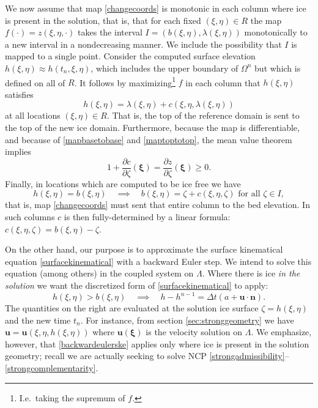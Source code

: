 \documentclass[letterpaper,final,12pt,reqno]{amsart}
\newcommand{\bn}{\mathbf{n}}
\newcommand{\bu}{\mathbf{u}}
\newcommand{\bxi}{\bm{\xi}}
\begin{document}
We now assume that map \eqref{changecoords} is monotonic in each column where ice is present in the solution, that is, that for each fixed $(\xi,\eta)\in R$ the map $f(\cdot) = z(\xi,\eta,\cdot)$ takes the interval $I=(b(\xi,\eta),\lambda(\xi,\eta))$ monotonically to a new interval in a nondecreasing manner.  We include the possibility that $I$ is mapped to a single point.  Consider the computed surface elevation $h(\xi,\eta)\approx h(t_n,\xi,\eta)$, which includes the upper boundary of $\Omega^n$ but which is defined on all of $R$.  It follows by maximizing\footnote{I.e.~taking the supremum of $f$.} $f$ in each column that $h(\xi,\eta)$ satisfies
\begin{equation}
h(\xi,\eta) = \lambda(\xi,\eta) + c(\xi,\eta,\lambda(\xi,\eta)) \label{maptoptotop}
\end{equation}
at all locations $(\xi,\eta)\in R$.  That is, the top of the reference domain is sent to the top of the new ice domain.  Furthermore, because the map is differentiable, and because of \eqref{mapbasetobase} and \eqref{maptoptotop}, the mean value theorem implies
\begin{equation}
1 + \frac{\partial c}{\partial \zeta}(\bxi) = \frac{\partial z}{\partial \zeta}(\bxi) \ge 0. \label{mapmonotonic}
\end{equation}
Finally, in locations which are computed to be ice free we have
\begin{equation}
h(\xi,\eta)=b(\xi,\eta) \quad \implies \quad b(\xi,\eta) = \zeta + c(\xi,\eta,\zeta) \text{ for all } \zeta \in I, \label{mapcrushes}
\end{equation}
that is, map \eqref{changecoords} must sent that entire column to the bed elevation.  In such columns $c$ is then fully-determined by a linear formula: $c(\xi,\eta,\zeta) = b(\xi,\eta) - \zeta$.

On the other hand, our purpose is to approximate the surface kinematical equation \eqref{surfacekinematical} with a backward Euler step.  We intend to solve this equation (among others) in the coupled system on $\Lambda$.  Where there is ice \emph{in the solution} we want the discretized form of \eqref{surfacekinematical} to apply:
\begin{equation}
h(\xi,\eta)>b(\xi,\eta) \quad \implies \quad h - h^{n-1} = \Delta t\left(a + \bu \cdot \bn\right). \label{backwardeulerske}
\end{equation}
The quantities on the right are evaluated at the solution ice surface $\zeta=h(\xi,\eta)$ and the new time $t_n$.  For instance, from section \ref{sec:stronggeometry} we have $\bu=\bu(\xi,\eta,h(\xi,\eta))$ where $\bu(\bxi)$ is the velocity solution on $\Lambda$.  We emphasize, however, that \eqref{backwardeulerske} applies only where ice is present in the solution geometry; recall we are actually seeking to solve NCP \eqref{strongadmissibility}--\eqref{strongcomplementarity}.
\end{document}
